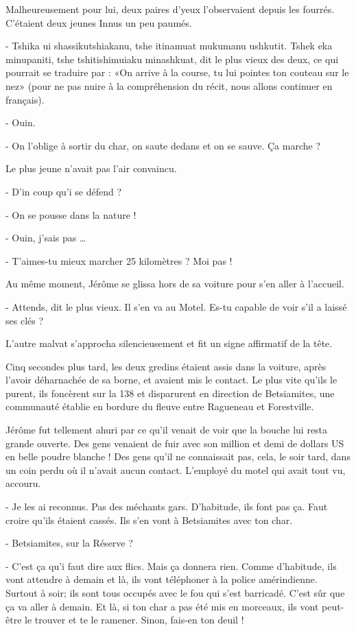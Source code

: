 Malheureusement pour lui, deux paires d’yeux l’observaient depuis les fourrés. C’étaient deux jeunes Innus un peu paumés.

- Tshika ui shassikutshiakanu, tshe itinamuat mukumanu ushkutit. Tshek eka minupaniti, tshe tshitishimuiaku minashkuat, dit le plus vieux des deux, ce qui pourrait se traduire par : «On arrive à la course, tu lui pointes ton couteau sur le nez» (pour ne pas nuire à la compréhension du récit, nous allons continuer en français).

- Ouin.

- On l’oblige à sortir du char, on saute dedans et on se sauve. Ça marche ?

Le plus jeune n’avait pas l’air convaincu.

- D’in coup qu’i se défend ?

- On se pousse dans la nature !

- Ouin, j’sais pas …

- T’aimes-tu mieux marcher 25 kilomètres ? Moi pas !

Au même moment, Jérôme se glissa hors de sa voiture pour s’en aller à l’accueil.

- Attends, dit le plus vieux. Il s’en va au Motel. Es-tu capable de voir s’il a laissé ses clés ?

L’autre malvat s’approcha silencieusement et fit un signe affirmatif de la tête.

Cinq secondes plus tard, les deux gredins étaient assis dans la voiture, après l’avoir déharnachée de sa borne, et avaient mis le contact. Le plus vite qu’ils le purent, ils foncèrent sur la 138 et disparurent en direction de Betsiamites, une communauté établie en bordure du fleuve entre Ragueneau et Forestville.

Jérôme fut tellement ahuri par ce qu’il venait de voir que la bouche lui resta grande ouverte. Des gens venaient de fuir avec son million et demi de dollars US en belle poudre blanche ! Des gens qu’il ne connaissait pas, cela, le soir tard, dans un coin perdu où il n’avait aucun contact. L’employé du motel qui avait tout vu, accouru.

- Je les ai reconnus. Pas des méchants gars. D’habitude, ils font pas ça. Faut croire qu’ils étaient cassés. Ils s’en vont à Betsiamites avec ton char.

- Betsiamites, sur la Réserve ?

- C’est ça qu’i faut dire aux flics. Mais ça donnera rien. Comme d’habitude, ils vont attendre à demain et là, ils vont téléphoner à la police amérindienne. Surtout à soir; ils sont tous occupés avec le fou qui s’est barricadé. C’est sûr que ça va aller à demain. Et là, si ton char a pas été mis en morceaux, ils vont peut-être le trouver et te le ramener. Sinon, fais-en ton deuil !

